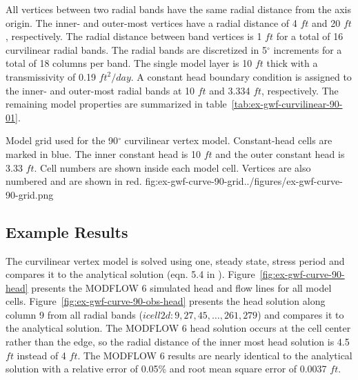 All vertices between two radial bands have the same radial distance from the axis origin. The inner- and outer-most vertices have a radial distance of 4 $ft$ and 20 $ft$, respectively. The radial distance between band vertices is 1 $ft$ for a total of 16 curvilinear radial bands. The radial bands are discretized in 5$^{\circ}$ increments for a total of 18 columns per band. The single model layer is 10 $ft$ thick with a transmissivity of 0.19 $ft^2/day$. A constant head boundary condition is assigned to the inner- and outer-most radial bands at 10 $ft$ and 3.334 $ft$, respectively. The remaining model properties are summarized in table~\ref{tab:ex-gwf-curvilinear-90-01}.

\begin{StandardFigure}{
                                     Model grid used for the 90$^{\circ}$ curvilinear vertex model.
                                     Constant-head cells are marked in blue.
                                     The inner constant head is 10 $ft$ and the outer constant head is 3.33 $ft$.
                                     Cell numbers are shown inside each model cell.
                                     Vertices are also numbered and are shown in red.
                                     }{fig:ex-gwf-curve-90-grid}{../figures/ex-gwf-curve-90-grid.png}
\end{StandardFigure}




\subsection{Example Results}
The curvilinear vertex model is solved using one, steady state, stress period and compares it to the analytical solution (eqn. 5.4 in \cite{crank1975diffusion}). Figure~\ref{fig:ex-gwf-curve-90-head} presents the MODFLOW 6 simulated head and flow lines for all model cells. Figure~\ref{fig:ex-gwf-curve-90-obs-head} presents the head solution along column 9 from all radial bands ($icell2d\colon 9, 27, 45, \ldots, 261, 279$) and compares it to the analytical solution. The MODFLOW 6 head solution occurs at the cell center rather than the edge, so the radial distance of the inner most head solution is 4.5 $ft$ instead of 4 $ft$. The MODFLOW 6 results are nearly identical to the analytical solution with a relative error of 0.05\% and root mean square error of 0.0037 $ft$.

